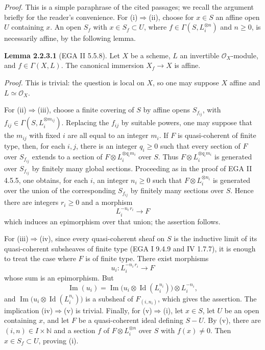 \emph{Proof.} This is a simple paraphrase of the cited passages; we recall the argument briefly for the reader's convenience. For (i)$\Rightarrow$(ii), choose for $x\in S$ an affine open $U$ containing $x$. An open $S_f$ with $x\in S_f\subset U$, where $f\in\Gamma(S,L_i^{\otimes n})$ and $n\ge0$, is necessarily affine, by the following lemma.

\textbf{Lemma 2.2.3.1} (EGA II 5.5.8). Let $X$ be a scheme, $L$ an invertible $\mathcal O_X$-module, and $f\in\Gamma(X,L)$. The canonical immersion $X_f\to X$ is affine.

\emph{Proof.} This is trivial: the question is local on $X$, so one may suppose $X$ affine and $L\simeq\mathcal O_X$.

For (ii)$\Rightarrow$(iii), choose a finite covering of $S$ by affine opens $S_{f_{ij}}$, with $f_{ij}\in\Gamma(S,L_i^{\otimes m_{ij}})$. Replacing the $f_{ij}$ by suitable powers, one may suppose that the $m_{ij}$ with fixed $i$ are all equal to an integer $m_i$. If $F$ is quasi-coherent of finite type, then, for each $i,j$, there is an integer $q_i\ge0$ such that every section of $F$ over $S_{f_{ij}}$ extends to a section of $F\otimes L_i^{\otimes q_im_i}$ over $S$. Thus $F\otimes L_i^{\otimes q_im_i}$ is generated over $S_{f_{ij}}$ by finitely many global sections. Proceeding as in the proof of EGA II 4.5.5, one obtains, for each $i$, an integer $n_i\ge0$ such that $F\otimes L_i^{\otimes n_i}$ is generated over the union of the corresponding $S_{f_{ij}}$ by finitely many sections over $S$. Hence there are integers $r_i\ge0$ and a morphism
\[
L_i^{-n_i\, r_i}\longrightarrow F
\]
which induces an epimorphism over that union; the assertion follows.

For (iii)$\Rightarrow$(iv), since every quasi-coherent sheaf on $S$ is the inductive limit of its quasi-coherent subsheaves of finite type (EGA I 9.4.9 and IV 1.7.7), it is enough to treat the case where $F$ is of finite type. There exist morphisms
\[
u_i:L_i^{-n_i\, r_i}\longrightarrow F
\]
whose sum is an epimorphism. But
\[
\operatorname{Im}(u_i)=\operatorname{Im}\bigl(u_i\otimes\operatorname{Id}(L_i^{n_i})\bigr)\otimes L_i^{-n_i},
\]
and $\operatorname{Im}\bigl(u_i\otimes\operatorname{Id}(L_i^{n_i})\bigr)$ is a subsheaf of $F_{(i,n_i)}$, which gives the assertion. The implication (iv)$\Rightarrow$(v) is trivial. Finally, for (v)$\Rightarrow$(i), let $x\in S$, let $U$ be an open containing $x$, and let $F$ be a quasi-coherent ideal defining $S-U$. By (v), there are $(i,n)\in I\times\mathbb N$ and a section $f$ of $F\otimes L_i^{\otimes n}$ over $S$ with $f(x)\ne0$. Then $x\in S_f\subset U$, proving (i).

